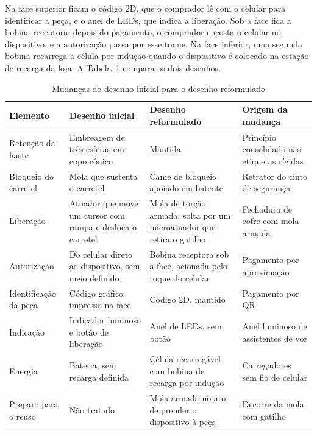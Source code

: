 Na face superior ficam o código 2D, que o comprador lê com o celular para identificar a peça, e o anel de LEDs, que indica a liberação. Sob a face fica a bobina receptora: depois do pagamento, o comprador encosta o celular no dispositivo, e a autorização passa por esse toque. Na face inferior, uma segunda bobina recarrega a célula por indução quando o dispositivo é colocado na estação de recarga da loja. A Tabela~\ref{tab:reform_mudancas} compara os dois desenhos.

\begin{table}[htbp]
    \centering
    \caption{Mudanças do desenho inicial para o desenho reformulado}
    \label{tab:reform_mudancas}
    \footnotesize
    \renewcommand{\arraystretch}{1.3}
    \begin{tabularx}{\textwidth}{@{}
        >{\RaggedRight\arraybackslash}p{2.6cm}
        >{\RaggedRight\arraybackslash}X
        >{\RaggedRight\arraybackslash}X
        >{\RaggedRight\arraybackslash}p{3.4cm}@{}}
        \toprule
        \textbf{Elemento} & \textbf{Desenho inicial} & \textbf{Desenho reformulado} & \textbf{Origem da mudança} \\
        \midrule
        Retenção da haste & Embreagem de três esferas em copo cônico & Mantida & Princípio consolidado nas etiquetas rígidas \\
        Bloqueio do carretel & Mola que sustenta o carretel & Came de bloqueio apoiado em batente & Retrator do cinto de segurança \\
        Liberação & Atuador que move um cursor com rampa e desloca o carretel & Mola de torção armada, solta por um microatuador que retira o gatilho & Fechadura de cofre com mola armada \\
        Autorização & Do celular direto ao dispositivo, sem meio definido & Bobina receptora sob a face, acionada pelo toque do celular & Pagamento por aproximação \\
        Identificação da peça & Código gráfico impresso na face & Código 2D, mantido & Pagamento por QR \\
        Indicação & Indicador luminoso e botão de liberação & Anel de LEDs, sem botão & Anel luminoso de assistentes de voz \\
        Energia & Bateria, sem recarga definida & Célula recarregável com bobina de recarga por indução & Carregadores sem fio de celular \\
        Preparo para o reuso & Não tratado & Mola armada no ato de prender o dispositivo à peça & Decorre da mola com gatilho \\
        \bottomrule
    \end{tabularx}
\end{table}

